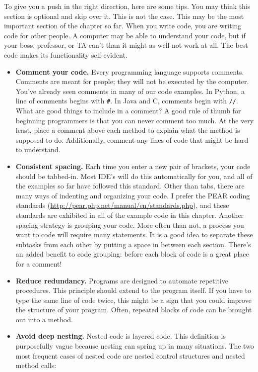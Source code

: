\documentclass[a4paper]{article}
\begin{document}
To give you a push in the right direction, here are some tips. You may think this section is optional and skip over it. This is not the case. This may be the most important section of the chapter so far. When you write code, you are writing code for other people. A computer may be able to understand your code, but if your boss, professor, or TA can't than it might as well not work at all. The best code makes its functionality self-evident. 

\begin{itemize}
\item {\bf Comment your code.} Every programming language supports comments. Comments are meant for people; they will not be executed by the computer. You've already seen comments in many of our code examples. In Python, a line of comments begins with \texttt{\#}. In Java and C, comments begin with \texttt{//}. What are good things to include in a comment? A good rule of thumb for beginning programmers is that you can never comment too much. At the very least, place a comment above each method to explain what the method is supposed to do. Additionally, comment any lines of code that might be hard to understand.

\item {\bf Consistent spacing.} Each time you enter a new pair of brackets, your code should be tabbed-in. Most IDE's will do this automatically for you, and all of the examples so far have followed this standard. Other than tabs, there are many ways of indenting and organizing your code. I prefer the PEAR coding standards (\url{http://pear.php.net/manual/en/standards.php}), and these standards are exhibited in all of the example code in this chapter. Another spacing strategy is grouping your code. More often than not, a process you want to code will require many statements. It is a good idea to separate these subtasks from each other by putting a space in between each section. There's an added benefit to code grouping: before each block of code is a great place for a comment!

\item   {\bf Reduce redundancy.} Programs are designed to automate repetitive procedures. This principle should extend to the program itself. If you have to type the same line of code twice, this might be a sign that you could improve the structure of your program. Often, repeated blocks of code can be brought out into a method.

\item   {\bf Avoid deep nesting.} Nested code is layered code. This definition is purposefully vague because nesting can spring up in many situations. The two most frequent cases of nested code are nested control structures and nested method calls:


\end{itemize}
\end{document}

